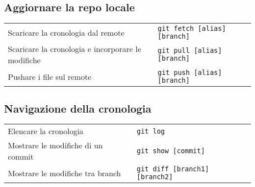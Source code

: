 \documentclass[a4paper, 11pt]{article}
\begin{document}
		\subsection{Aggiornare la repo locale}
		\begin{tabular}{p{9cm} p{6cm}}
			Scaricare la cronologia dal remote& \verb|git fetch [alias] [branch]| \\
			Scaricare la cronologia e incorporare le modifiche& \verb|git pull [alias] [branch]| \\
			Pushare i file sul remote& \verb|git push [alias] [branch]|\\
		\end{tabular}
		
		\subsection{Navigazione della cronologia}
		\begin{tabular}{p{9cm} p{6cm}}
			Elencare la cronologia& \verb|git log|\\
			Mostrare le modifiche di un commit& \verb|git show [commit]|\\
			Mostrare le modifiche tra branch& \verb|git diff [branch1] [branch2]|\\
		\end{tabular}
	
	
	

	


	
	
	
	
	
	
	
	
\end{document}
